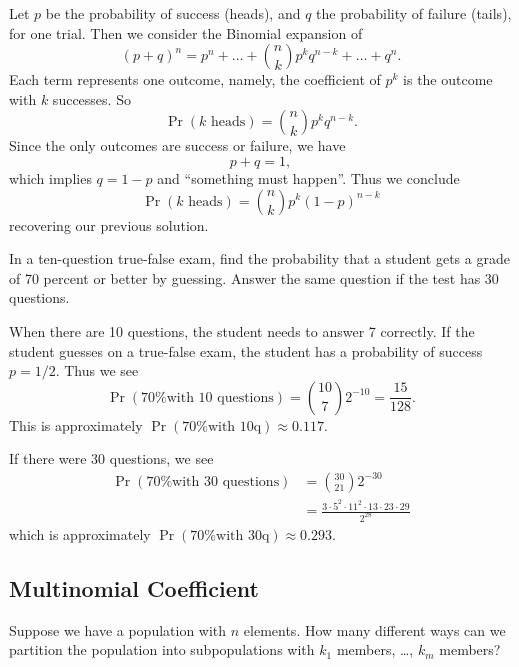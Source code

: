 Let $p$ be the probability of success (heads), and $q$ the probability
of failure (tails), for one trial. Then we consider the Binomial
expansion of 
\begin{equation}
(p+q)^{n}=p^{n}+\dots+\binom{n}{k}p^{k}q^{n-k}+\dots+q^{n}.
\end{equation}
Each term represents one outcome, namely, the coefficient of $p^{k}$ is
the outcome with $k$ successes. So
\begin{equation}
\Pr(\mbox{$k$ heads})=\binom{n}{k}p^{k}q^{n-k}.
\end{equation}
Since the only outcomes are success or failure, we have
\begin{equation}
p+q=1,
\end{equation}
which implies $q=1-p$ and ``something must happen''. Thus we conclude
\begin{equation}
\Pr(\mbox{$k$ heads})=\binom{n}{k}p^{k}(1-p)^{n-k}
\end{equation}
recovering our previous solution.

\label{ex:studentGuessingOnExam}
In a ten-question true-false exam, find the probability that a student
gets a grade of 70 percent or better by guessing. Answer the same
question if the test has 30 questions.

When there are 10 questions, the student needs to answer 7 correctly. If
the student guesses on a true-false exam, the student has a probability
of success $p=1/2$. Thus we see
\begin{equation}
\Pr(\mbox{70\% with 10 questions}) = \binom{10}{7}2^{-10}=\frac{15}{128}.
\end{equation}
This is approximately $\Pr(\mbox{70\% with 10q})\approx 0.117$.

If there were 30 questions, we see
\begin{equation}
\begin{split}
\Pr(\mbox{70\% with 30 questions}) &= \binom{30}{21}2^{-30}\\
&=\frac{3\cdot5^{2}\cdot11^{2}\cdot13\cdot23\cdot29}{2^{28}}
\end{split}
\end{equation}
which is approximately $\Pr(\mbox{70\% with 30q})\approx 0.293$.

\subsection{Multinomial Coefficient}
\M
Suppose we have a population with $n$ elements. How many different ways
can we partition the population into subpopulations with $k_1$
members, \dots, $k_m$ members?

